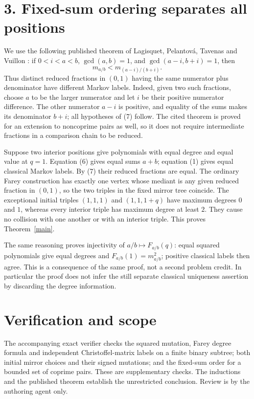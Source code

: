 \documentclass[11pt]{article}
\begin{document}
\section*{3. Fixed-sum ordering separates all positions}
We use the following published theorem of Lagisquet, Pelantov\'a,
Tavenas and Vuillon \cite[Theorem 2(3), Proposition 22]{fixedsum}:
if $0<i<a<b$, $\gcd(a,b)=1$, and $\gcd(a-i,b+i)=1$, then
\[
 m_{a/b}<m_{(a-i)/(b+i)}.                               \tag{7}
\]
Thus distinct reduced fractions in $(0,1)$ having the same numerator
plus denominator have different Markov labels. Indeed, given two such
fractions, choose $a$ to be the larger numerator and let $i$ be their
positive numerator difference. The other numerator $a-i$ is positive,
and equality of the sums makes its denominator $b+i$; all hypotheses
of (7) follow. The cited theorem is proved for an extension to
noncoprime pairs as well, so it does not require intermediate fractions
in a comparison chain to be reduced.

Suppose two interior positions give polynomials with equal degree and
equal value at $q=1$. Equation (6) gives equal sums $a+b$; equation (1)
gives equal classical Markov labels. By (7) their reduced fractions
are equal. The ordinary Farey construction has exactly one vertex
whose mediant is any given reduced fraction in $(0,1)$, so the two
triples in the fixed mirror tree coincide.
The exceptional initial triples $(1,1,1)$ and $(1,1,1+q)$ have
maximum degrees $0$ and $1$, whereas every interior triple has
maximum degree at least $2$. They cause no collision with one another
or with an interior triple. This proves Theorem~\ref{main}.

The same reasoning proves injectivity of $a/b\mapsto F_{a/b}(q)$:
equal squared polynomials give equal degrees and
$F_{a/b}(1)=m_{a/b}^2$; positive classical labels then agree.
This is a consequence of the same proof, not a second problem credit.
In particular the proof does not infer the still separate classical
uniqueness assertion by discarding the degree information.

\section*{Verification and scope}
The accompanying exact verifier checks the squared mutation, Farey
degree formula and independent Christoffel-matrix labels on a finite
binary subtree; both initial mirror choices and their signed mutations;
and the fixed-sum order for a bounded set of coprime pairs. These are
supplementary checks. The inductions and the published theorem establish
the unrestricted conclusion. Review is by the authoring agent only.
\end{document}
